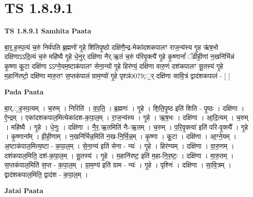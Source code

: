 \documentclass[17pt]{extarticle}
\begin{document}
\section*{ TS 1.8.9.1 }

\textbf{TS 1.8.9.1 } \newline
\textbf{Samhita Paata} \newline

बा॒र्॒.ह॒स्प॒त्यं च॒रुं निर्व॑पति ब्र॒ह्मणो॑ गृ॒हे शि॑तिपृ॒ष्ठो दक्षि॑णै॒न्द्र-मेका॑दशकपालꣳ राज॒न्य॑स्य गृ॒ह ऋ॑ष॒भो दक्षि॑णाऽऽदि॒त्यं च॒रुं महि॑ष्यै गृ॒हे धे॒नुर् दक्षि॑णा नैर्.ऋ॒तं च॒रुं प॑रिवृ॒क्त्यै॑ गृ॒हे कृ॒ष्णानां᳚ ॅव्रीही॒णां न॒खनि॑र्भिन्नं कृ॒ष्णा कू॒टा दक्षि॑णा ऽऽग्ने॒यम॒ष्टाक॑पालꣳ सेना॒न्यो॑ गृ॒हे हिर॑ण्यं॒ दक्षि॑णा वारु॒णं दश॑कपालꣳ सू॒तस्य॑ गृ॒हे म॒हानि॑रष्टो॒ दक्षि॑णा मारु॒तꣳ स॒प्तक॑पालं ग्राम॒ण्यो॑ गृ॒हे पृश्ञ॑0079;॒र् दक्षि॑णा सावि॒त्रं द्वाद॑शकपालं - [ ] \newline

\textbf{Pada Paata} \newline

बा॒र्.॒ह॒स्प॒त्यम् । च॒रुम् । निरिति॑ । व॒प॒ति॒ । ब्र॒ह्मणः॑ । गृ॒हे । शि॒ति॒पृ॒ष्ठ इति॑ शिति - पृ॒ष्ठः । दक्षि॑णा । ऐ॒न्द्रम् । एका॑दशकपाल॒मित्येका॑दश-क॒पा॒ल॒म् । रा॒ज॒न्य॑स्य । गृ॒हे । ऋ॒ष॒भः । दक्षि॑णा । आ॒दि॒त्यम् । च॒रुम् । महि॑ष्यै । गृ॒हे । धे॒नुः । दक्षि॑णा । नै॒र॒.ऋ॒तमिति॑ नैः-ऋ॒तम् । च॒रुम् । प॒रि॒वृ॒क्त्या॑ इति॑ परि-वृ॒क्त्यै᳚ । गृ॒हे । कृ॒ष्णाना᳚म् । व्री॒ही॒णाम् । न॒खनि॑र्भिन्न॒मिति॑ न॒ख-नि॒र्भि॒न्न॒म् । कृ॒ष्णा । कू॒टा । दक्षि॑णा । आ॒ग्ने॒यम् । अ॒ष्टाक॑पाल॒मित्य॒ष्टा - क॒पा॒ल॒म् । से॒ना॒न्य॑ इति॑ सेना - न्यः॑ । गृ॒हे । हिर॑ण्यम् । दक्षि॑णा । वा॒रु॒णम् । दश॑कपाल॒मिति॒ दश॑-क॒पा॒ल॒म् । सू॒तस्य॑ । गृ॒हे । म॒हानि॑रष्ट॒ इति॑ म॒हा-नि॒र॒ष्टः॒ । दक्षि॑णा । मा॒रु॒तम् । स॒प्तक॑पाल॒मिति॑ स॒प्त - क॒पा॒ल॒म् । ग्रा॒म॒ण्य॑ इति॑ ग्राम - न्यः॑ । गृ॒हे । पृश्निः॑ । दक्षि॑णा । सा॒वि॒त्रम् । द्वाद॑शकपाल॒मिति॒ द्वाद॑श - क॒पा॒ल॒म् ।  \newline



\textbf{Jatai Paata} \newline
\end{document}
